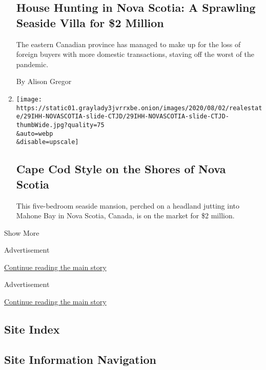 \begin{enumerate}
  \hypertarget{house-hunting-in-nova-scotia-a-sprawling-seaside-villa-for-2-million}{%
  \subsection{House Hunting in Nova Scotia: A Sprawling Seaside Villa
  for \$2
  Million}\label{house-hunting-in-nova-scotia-a-sprawling-seaside-villa-for-2-million}}

  The eastern Canadian province has managed to make up for the loss of
  foreign buyers with more domestic transactions, staving off the worst
  of the pandemic.

  By Alison Gregor
\item
  \href{/slideshow/2020/07/29/realestate/cape-cod-style-on-the-shores-of-nova-scotia.html}{}

  \texttt{[image: https://static01.graylady3jvrrxbe.onion/images/2020/08/02/realestate/29IHH-NOVASCOTIA-slide-CTJD/29IHH-NOVASCOTIA-slide-CTJD-thumbWide.jpg?quality=75\\\&auto=webp\\\&disable=upscale]}

  \hypertarget{cape-cod-style-on-the-shores-of-nova-scotia}{%
  \subsection{Cape Cod Style on the Shores of Nova
  Scotia}\label{cape-cod-style-on-the-shores-of-nova-scotia}}

  This five-bedroom seaside mansion, perched on a headland jutting into
  Mahone Bay in Nova Scotia, Canada, is on the market for \$2 million.
\end{enumerate}

Show More

Advertisement

\protect\hyperlink{after-mid3}{Continue reading the main story}

Advertisement

\protect\hyperlink{after-mktg}{Continue reading the main story}

\hypertarget{site-index}{%
\subsection{Site Index}\label{site-index}}

\hypertarget{site-information-navigation}{%
\subsection{Site Information
Navigation}\label{site-information-navigation}}

